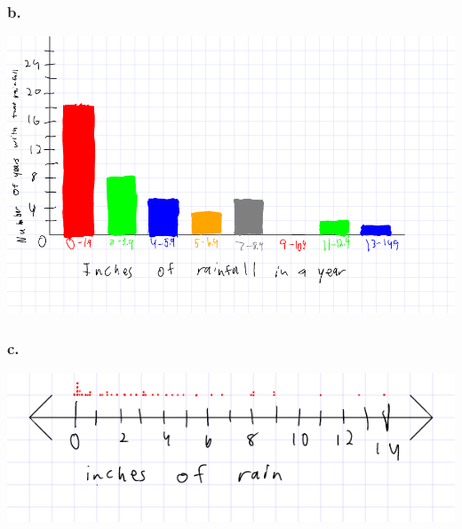 \documentclass[11pt]{article}
\begin{document}
\subsubsection*{b.}
\includegraphics{homework2_section13_problem1b_histogram}

\subsubsection*{c.}
\includegraphics{homework2_section13_problem1c_dotplot}
\end{document}
